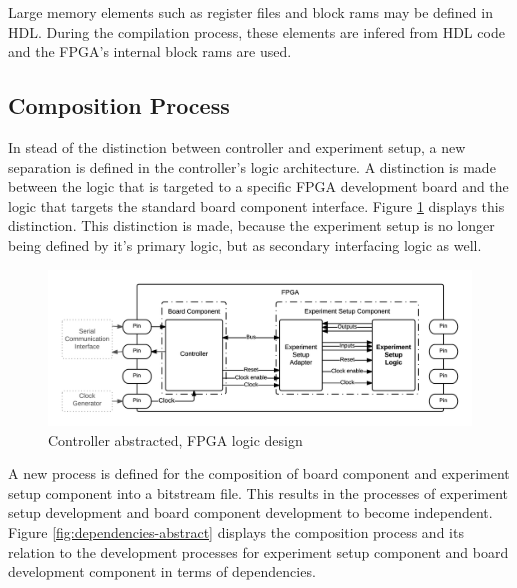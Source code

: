 \documentclass[openright]{template/uva-bachelor-thesis}
\begin{document}
Large memory elements such as register files and block rams may be defined in HDL. During the compilation process, these elements are infered from HDL code and the FPGA's internal block rams are used. 



\subsection{Composition Process}
In stead of the distinction between controller and experiment setup, a new separation is defined in the controller's logic architecture. A distinction is made between the logic that is targeted to a specific FPGA development board and the logic that targets the standard board component interface. Figure \ref{fig:fpga-abstract} displays this distinction. This distinction is made, because the experiment setup is no longer being defined by it's primary logic, but as secondary interfacing logic as well. 


\begin{figure}[h]
\centering
\includegraphics[width=.8\textwidth]{img/fpga-abstract}
\caption{Controller abstracted, FPGA logic design}
\label{fig:fpga-abstract}
\end{figure}

A new process is defined for the composition of board component and experiment setup component into a bitstream file. This results in the processes of experiment setup development and board component development to become independent. Figure \ref{fig:dependencies-abstract} displays the composition process and its relation to the  development processes for experiment setup component and board development component in terms of dependencies. 
\end{document}

